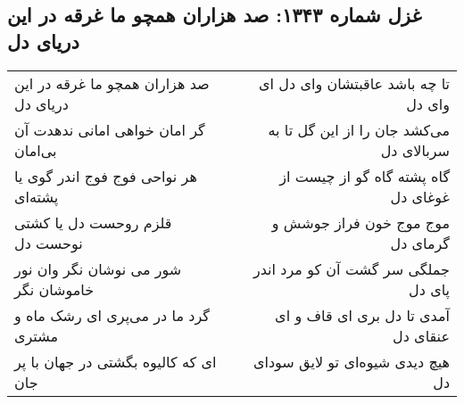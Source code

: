 \begin{center}
\section*{غزل شماره ۱۳۴۳: صد هزاران همچو ما غرقه در این دریای دل}
\label{sec:1343}
\begin{longtable}{l p{0.5cm} r}
صد هزاران همچو ما غرقه در این دریای دل
&&
تا چه باشد عاقبتشان وای دل ای وای دل
\\
گر امان خواهی امانی ندهدت آن بی‌امان
&&
می‌کشد جان را از این گل تا به سربالای دل
\\
هر نواحی فوج فوج اندر گوی یا پشته‌ای
&&
گاه پشته گاه گو از چیست از غوغای دل
\\
قلزم روحست دل یا کشتی نوحست دل
&&
موج موج خون فراز جوشش و گرمای دل
\\
شور می نوشان نگر وان نور خاموشان نگر
&&
جملگی سر گشت آن کو مرد اندر پای دل
\\
گرد ما در می‌پری ای رشک ماه و مشتری
&&
آمدی تا دل بری ای قاف و ای عنقای دل
\\
ای که کالیوه بگشتی در جهان با پر جان
&&
هیچ دیدی شیوه‌ای تو لایق سودای دل
\\
\end{longtable}
\end{center}

